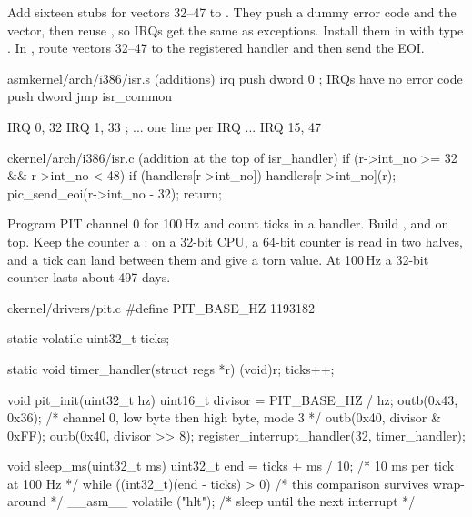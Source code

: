 \documentclass[11pt,a4paper]{article}
\begin{document}
Add sixteen stubs for vectors 32--47 to . They push a dummy error code and the vector, then reuse
, so IRQs get the same  as exceptions. Install them in  with type
. In , route vectors 32--47 to the registered handler and then send the EOI.

\begin{lst}{asm}{kernel/arch/i386/isr.s (additions)}
irq%
    push dword 0            ; IRQs have no error code
    push dword %
    jmp  isr_common

IRQ 0, 32
IRQ 1, 33
; ... one line per IRQ ...
IRQ 15, 47
\end{lst}

\begin{lst}{c}{kernel/arch/i386/isr.c (addition at the top of isr_handler)}
if (r->int_no >= 32 && r->int_no < 48) {
    if (handlers[r->int_no])
        handlers[r->int_no](r);
    pic_send_eoi(r->int_no - 32);
    return;
}
\end{lst}

Program PIT channel 0 for 100\,Hz and count ticks in a handler. Build ,
 and  on top. Keep the counter a : on a 32-bit CPU, a
64-bit counter is read in two halves, and a tick can land between them and give a torn value. At 100\,Hz a 32-bit
counter lasts about 497 days.

\begin{lst}{c}{kernel/drivers/pit.c}
#define PIT_BASE_HZ 1193182

static volatile uint32_t ticks;

static void timer_handler(struct regs *r) { (void)r; ticks++; }

void pit_init(uint32_t hz)
{
    uint16_t divisor = PIT_BASE_HZ / hz;
    outb(0x43, 0x36);                   /* channel 0, low byte then high byte, mode 3 */
    outb(0x40, divisor & 0xFF);
    outb(0x40, divisor >> 8);
    register_interrupt_handler(32, timer_handler);
}

void sleep_ms(uint32_t ms)
{
    uint32_t end = ticks + ms / 10;     /* 10 ms per tick at 100 Hz */
    while ((int32_t)(end - ticks) > 0)  /* this comparison survives wrap-around */
        __asm__ volatile ("hlt");       /* sleep until the next interrupt */
}
\end{lst}
\end{document}
